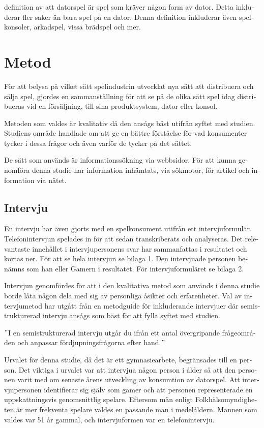 \documentclass[11p]{article}
\begin{document}
\begin{otherlanguage}{swedish}
        \textcite{ComputerSweden} definition av att datorspel är spel som kräver någon form av dator.
        Detta inkluderar fler saker än bara spel på en dator.
        Denna definition inkluderar även spelkonsoler, arkadspel, vissa brädspel och mer.


        \section{Metod}

        För att belysa på vilket sätt spelindustrin utvecklat nya sätt att distribuera och sälja spel, gjordes en sammanställning för att se på de olika sätt spel idag distribueras vid en försäljning, till sina produktsystem, dator eller konsol.

        Metoden som valdes är kvalitativ då den ansågs bäst utifrån syftet med studien.
        Studiens område handlade om att ge en bättre förståelse för vad konsumenter tycker i dessa frågor och även varför de tycker på det sättet.

        De sätt som används är informationssökning via webbsidor.
        För att kunna genomföra denna studie har information inhämtats, via sökmotor, för artikel och information via nätet.

        \subsection{Intervju}
        En intervju har även gjorts med en spelkonsument utifrån ett intervjuformulär.
        Telefonintervjun spelades in för att sedan transkriberats och analyseras.
        Det relevantaste innehållet i intervjupersonens svar har sammanfattas i resultatet och kortas ner.
        För att se hela intervjun se bilaga 1.
        Den intervjuade personen benämns som han eller Gamern i resultatet.
        För intervjuformuläret se bilaga 2.

        Intervjun genomfördes för att i den kvalitativa metod som används i denna studie borde låta någon dela med sig av personliga åsikter och erfarenheter.
        Val av intervjumetod har utgått från en metodguide för inkluderande intervjuer där semistrukturerad intervju ansågs som bäst för att fylla syftet med studien.

        \("\)I en semistrukturerad intervju utgår du ifrån ett antal övergripande frågeområden och anpassar fördjupningsfrågorna efter hand.\("\) \parencite{Metodguide}

        Urvalet för denna studie, då det är ett gymnasiearbete, begränsades till en person.
        Det viktiga i urvalet var att intervjua någon person i ålder så att den personen varit med om senaste årens utveckling av konsumtion av datorspel.
        Att intervjupersonen identifierar sig själv som gamer och att personen representerade en uppskattningsvis genomsnittlig spelare.
        Eftersom män enligt Folkhälsomyndigheten är mer frekventa spelare valdes en passande man i medelåldern.
        Mannen som valdes var 51 år gammal, och intervjuformen var en telefonintervju.


\end{otherlanguage}
\end{document}

